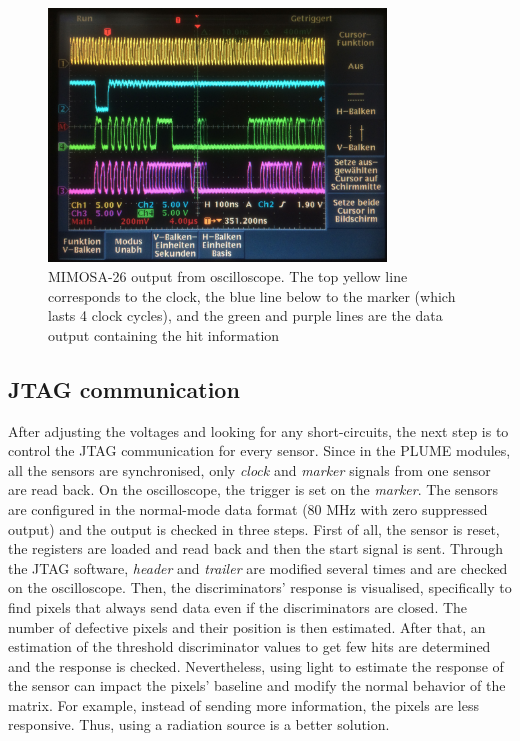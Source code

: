   \begin{figure}[!tbh]
    \centering
    \includegraphics[width=0.8\textwidth]{Pictures/labTests/mi26_output}
    \caption{MIMOSA-26 output from oscilloscope. The top yellow line corresponds to the clock, the blue line below to the marker (which lasts 4 clock cycles), and the green and purple lines are the data output containing the hit information}
    \label{fig:mi26Output}
  \end{figure}

  \subsection{JTAG communication}

  After adjusting the voltages and looking for any short-circuits, the next step is to control the \gls{JTAG} communication for every sensor.
  Since in the \gls{PLUME} modules, all the sensors are synchronised, only \textit{clock} and \textit{marker} signals from one sensor are read back.
  On the oscilloscope, the trigger is set on the \textit{marker}.  
  The sensors are configured in the normal-mode data format (80 MHz with zero suppressed output) and the output is checked in three steps.
  First of all, the sensor is reset, the registers are loaded and read back and then the start signal is sent. 
  Through the \gls{JTAG} software, \textit{header} and \textit{trailer} are modified several times and are checked on the oscilloscope.
  Then, the discriminators' response is visualised, specifically to find pixels that always send data even if the discriminators are closed.
  The number of defective pixels and their position is then estimated.
  After that, an estimation of the threshold discriminator values to get few hits are determined and the response is checked.
  Nevertheless, using light to estimate the response of the sensor can impact the pixels' baseline and modify the normal behavior of the matrix.
  For example, instead of sending more information, the pixels are less responsive.
  Thus, using a radiation source is a better solution.

